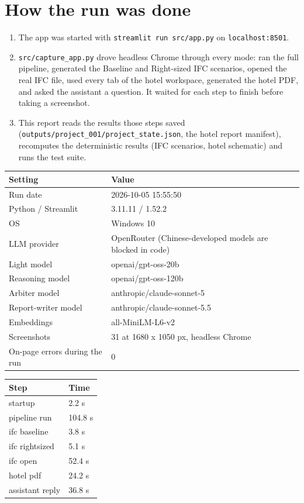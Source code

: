\documentclass[10pt]{article}
\begin{document}
\section{How the run was done}
\begin{enumerate}
\item The app was started with \texttt{streamlit run src/app.py} on \texttt{localhost:8501}.
\item \texttt{src/capture\_app.py} drove headless Chrome through every mode: ran the full pipeline, generated the
Baseline and Right-sized IFC scenarios, opened the real IFC file, used every tab of the hotel workspace, generated the
hotel PDF, and asked the assistant a question. It waited for each step to finish before taking a screenshot.
\item This report reads the results those steps saved (\texttt{outputs/project\_001/project\_state.json}, the hotel
report manifest), recomputes the deterministic results (IFC scenarios, hotel schematic) and runs the test suite.
\end{enumerate}
{\small \begin{longtable}{p{5cm}p{11cm}}
\toprule
\textbf{Setting} & \textbf{Value} \\ \midrule \endhead
Run date & 2026-10-05 15:55:50 \\
Python / Streamlit & 3.11.11 / 1.52.2 \\
OS & Windows 10 \\
LLM provider & OpenRouter (Chinese-developed models are blocked in code) \\
Light model & openai/gpt-oss-20b \\
Reasoning model & openai/gpt-oss-120b \\
Arbiter model & anthropic/claude-sonnet-5 \\
Report-writer model & anthropic/claude-sonnet-5.5 \\
Embeddings & all-MiniLM-L6-v2 \\
Screenshots & 31 at 1680 x 1050 px, headless Chrome \\
On-page errors during the run & 0 \\
\bottomrule
\end{longtable}}
{\small \begin{longtable}{p{6cm}p{3cm}}
\toprule
\textbf{Step} & \textbf{Time} \\ \midrule \endhead
startup & 2.2 s \\
pipeline run & 104.8 s \\
ifc baseline & 3.8 s \\
ifc rightsized & 5.1 s \\
ifc open & 52.4 s \\
hotel pdf & 24.2 s \\
assistant reply & 36.8 s \\
\bottomrule
\end{longtable}}
\end{document}
